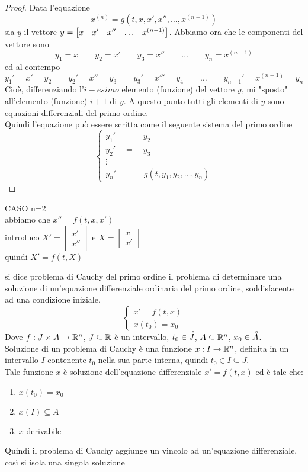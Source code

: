 \begin{proof}
	Data l'equazione
	$$x^{(n)} = g(t,x, x', x'',\ldots,x^{(n-1)})$$
	sia $y$ il vettore $y = \begin{bmatrix} x &  x' &  x'' & \ldots & x^{(n-1)} \end{bmatrix}$. Abbiamo ora che le componenti del vettore sono
	$$y_1=x\qquad y_2= x'\qquad y_3= x''\qquad \ldots\qquad y_n=x^{(n-1)}$$
	ed al contempo
	$$y_1'= x'=y_2\qquad y_2'= x''=y_3\qquad y_3'= x'''=y_4\qquad\ldots\qquad y_{n-1}'=x^{(n-1)}=y_n$$
	Cioè, differenziando l'$i-esimo$ elemento (funzione) del vettore $y$, mi "sposto" all'elemento (funzione) $i+1$ di $y$. A questo punto tutti gli elementi di $y$ sono equazioni differenziali del primo ordine.\\
	Quindi l'equazione può essere scritta come il seguente sistema del primo ordine
	$$\begin{cases}y_1'\quad=\quad y_2\\y_2'\quad=\quad y_3\\\vdots\\y_n'\quad=\quad g(t, y_1, y_2,\dots,y_n)\end{cases}$$
\end{proof}
\begin{example}
	CASO n=2\\
	abbiamo che $ x''=f(t,x, x')$\\
	introduco $ X'=\begin{bmatrix} x'\\ x''\end{bmatrix}$ e $X=\begin{bmatrix}x\\ x'\end{bmatrix}$\\
	quindi $ X'=f(t,X)$
\end{example}
\begin{definition}
	\label{def:prob_cauchy_ord_1}
	si dice problema di Cauchy del primo ordine il problema di determinare una soluzione di un'equazione differenziale ordinaria del primo ordine, soddisfacente ad una condizione iniziale.
	$$\begin{cases}x'=f(t,x)\\x(t_0)=x_0\end{cases}$$
	Dove $f:J\times A\to \mathbb{R}^n$, $J\subseteq \mathbb{R}$ è un intervallo, $t_0\in\accentset{\circ}{J}$, $A\subseteq \mathbb{R}^n$, $x_0\in\accentset{\circ}{A}$.\\
	Soluzione di un problema di Cauchy è una funzione $x:I\to \mathbb{R}^n$, definita in un intervallo $I$ contenente $t_0$ nella sua parte interna, quindi $t_0\in I\subseteq J$.\\
	Tale funzione $x$ è soluzione dell'equazione differenziale $x'=f(t,x)$ ed è tale che:
	\begin{enumerate}
		\item $x(t_0)=x_0$
		\item $x(I)\subseteq A$
		\item $x$ derivabile
	\end{enumerate}
	Quindi il problema di Cauchy aggiunge un vincolo ad un'equazione differenziale, così si isola una singola soluzione
\end{definition}
